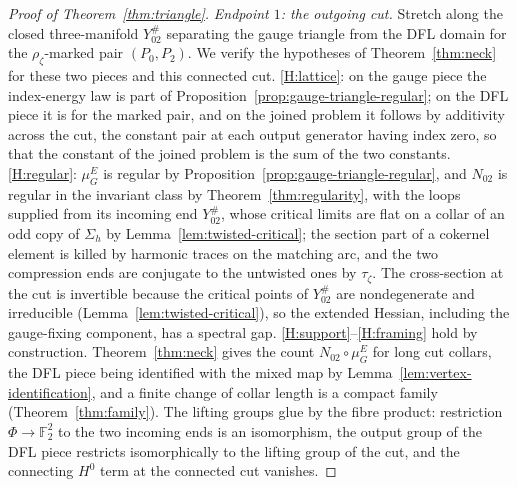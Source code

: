 \documentclass[11pt]{amsart}
\theoremstyle{definition}
\theoremstyle{remark}
\theoremstyle{plain}
\numberwithin{equation}{section}
\newcommand{\FF}{\mathbb{F}_2}
\begin{document}
\begin{proof}[Proof of Theorem~\ref{thm:triangle}]
\emph{Endpoint $1$: the outgoing cut.} Stretch along the closed
three-manifold $Y_{02}^\#$ separating the gauge triangle from the DFL domain
for the $\rho_\zeta$-marked pair $(P_0,P_2)$. We verify the hypotheses of
Theorem~\ref{thm:neck} for these two pieces and this connected cut.
\ref{H:lattice}: on the gauge piece the index-energy law is part of
Proposition~\ref{prop:gauge-triangle-regular}; on the DFL piece it is
\cite[Proposition~3.20, Lemma~3.15]{DFL} for the marked pair, and on the
joined problem it follows by additivity across the cut, the constant pair at
each output generator having index zero, so that the constant of the joined
problem is the sum of the two constants. \ref{H:regular}: $\mu_G^E$ is
regular by Proposition~\ref{prop:gauge-triangle-regular}, and $N_{02}$ is
regular in the invariant class by Theorem~\ref{thm:regularity}, with the
loops supplied from its incoming end $Y_{02}^\#$, whose critical limits are
flat on a collar of an odd copy of $\Sigma_h$ by
Lemma~\ref{lem:twisted-critical}; the section part of a cokernel element is
killed by harmonic traces on the matching arc, and the two
compression ends are conjugate to the untwisted ones by $\tau_\zeta$. The
cross-section at the cut is invertible because the critical points of
$Y_{02}^\#$ are nondegenerate and irreducible
(Lemma~\ref{lem:twisted-critical}), so the extended Hessian, including the gauge-fixing component, has a spectral gap. \ref{H:support}--\ref{H:framing} hold by
construction. Theorem~\ref{thm:neck} gives the count
$N_{02}\circ\mu_G^E$ for long cut collars, the DFL piece being identified with
the mixed map by Lemma~\ref{lem:vertex-identification}, and a finite change of collar
length is a compact family (Theorem~\ref{thm:family}). The lifting groups glue by the fibre
product: restriction $\Phi\to\FF^2$ to the two incoming ends is an
isomorphism, the output group of the DFL piece restricts isomorphically to
the lifting group of the cut, and the connecting $H^0$ term at the connected cut
vanishes.


\end{proof}
\end{document}
